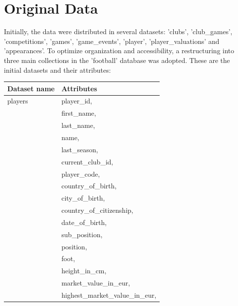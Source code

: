 \documentclass{Configuration_Files/PoliMi3i_thesis}
\begin{document}
\section{Original Data}
Initially, the data were distributed in several datasets: 'clubs', 'club\_games', 'competitions', 'games', 'game\_events', 'player', 'player\_valuations' and 'appearances'. To optimize organization and accessibility, a restructuring into three main collections in the 'football' database was adopted. These are the initial datasets and their attributes:
\begin{tabular}{|l|p{13cm}|}
	\hline
  \rowcolor{bluepoli!40}
	\textbf{Dataset name} & \textbf{Attributes}                       \\
	\hline
	players
	                      & player\_id,                               \\
	                      & first\_name,                              \\
	                      & last\_name,                               \\
	                      & name,                                     \\
	                      & last\_season,                             \\
	                      & current\_club\_id,                        \\
	                      & player\_code,                             \\
	                      & country\_of\_birth,                       \\
	                      & city\_of\_birth,                          \\
	                      & country\_of\_citizenship,                 \\
	                      & date\_of\_birth,                          \\
	                      & sub\_position,                            \\
	                      & position,                                 \\
	                      & foot,                                     \\
	                      & height\_in\_cm,                           \\
	                      & market\_value\_in\_eur,                   \\
	                      & highest\_market\_value\_in\_eur,          \\

\end{tabular}
\end{document}
